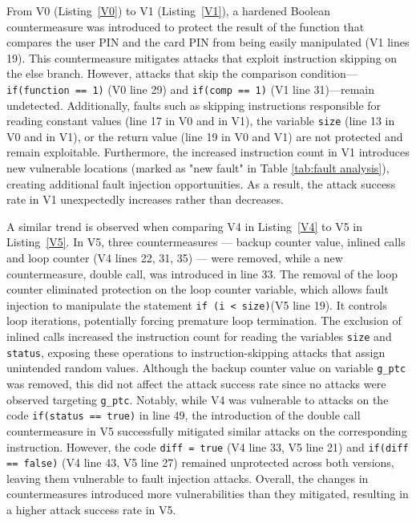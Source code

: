 From V0 (Listing~\ref{V0}) to V1 (Listing~\ref{V1}), a hardened Boolean countermeasure was introduced to protect the result of the function that compares the user PIN and the card PIN from being easily manipulated (V1 lines 19). This countermeasure mitigates attacks that exploit instruction skipping on the else branch. However, attacks that skip the comparison condition—\texttt{if(function == 1)} (V0 line 29) and \texttt{if(comp == 1)} (V1 line 31)—remain undetected. Additionally, faults such as skipping instructions responsible for reading constant values (line 17 in V0 and in V1), the variable \texttt{size} (line 13 in V0 and in V1), or the return value (line 19 in V0 and V1) are not protected and remain exploitable. Furthermore, the increased instruction count in V1 introduces new vulnerable locations (marked as "new fault" in Table \ref{tab:fault analysis}), creating additional fault injection opportunities. As a result, the attack success rate in V1 unexpectedly increases rather than decreases.

A similar trend is observed when comparing V4 in Listing~\ref{V4} to V5 in Listing~\ref{V5}. In V5, three countermeasures — backup counter value, inlined calls and loop counter (V4 lines 22, 31, 35)  — were removed, while a new countermeasure, double call, was introduced in line 33. The removal of the loop counter eliminated protection on the loop counter variable, which allows fault injection to manipulate the statement \texttt{if (i < size)}(V5 line 19). It controls loop iterations, potentially forcing premature loop termination. The exclusion of inlined calls increased the instruction count for reading the variables \texttt{size} and \texttt{status}, exposing these operations to instruction-skipping attacks that assign unintended random values. Although the backup counter value on variable \texttt{g\_ptc} was removed, this did not affect the attack success rate since no attacks were observed targeting \texttt{g\_ptc}. Notably, while V4 was vulnerable to attacks on the code \texttt{if(status == true)} in line 49, the introduction of the double call countermeasure in V5 successfully mitigated similar attacks on the corresponding instruction. However, the code \texttt{diff = true} (V4 line 33, V5 line 21) and \texttt{if(diff == false)} (V4 line 43, V5 line 27) remained unprotected across both versions, leaving them vulnerable to fault injection attacks. Overall, the changes in countermeasures introduced more vulnerabilities than they mitigated, resulting in a higher attack success rate in V5.

